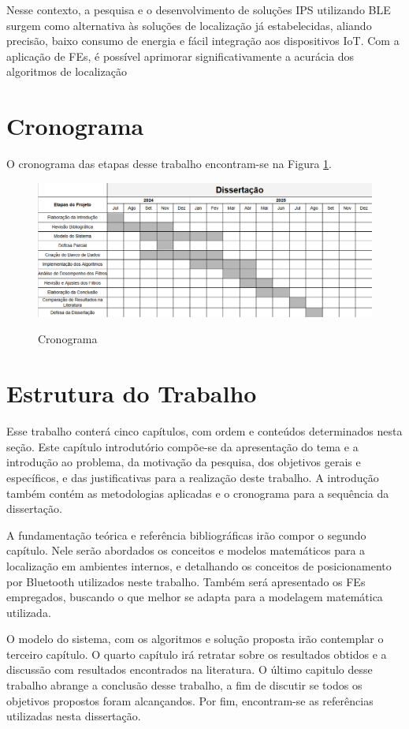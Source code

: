 Nesse contexto, a pesquisa e o desenvolvimento de soluções IPS utilizando BLE surgem como alternativa às soluções de localização já estabelecidas, aliando precisão, baixo consumo de energia e fácil integração aos dispositivos IoT. Com a aplicação de FEs, é possível aprimorar significativamente a acurácia dos algoritmos de localização


\section{Cronograma}
\label{sec:cronograma}

O cronograma das etapas desse trabalho encontram-se na Figura \ref{fig:crongrama}.

\begin{figure}[ht]
    \centering
    \caption{Cronograma}
    \includegraphics[width=\linewidth]{Imagens/cronograma_dissertacao.png}
    \label{fig:crongrama}
\end{figure}

\section{Estrutura do Trabalho}
\label{sec:estrutura}

Esse trabalho conterá cinco capítulos, com ordem e conteúdos determinados nesta seção. Este capítulo introdutório compõe-se da apresentação do tema e a introdução ao problema, da motivação da pesquisa, dos objetivos gerais e específicos, e das justificativas para a realização deste trabalho. A introdução também contém as metodologias aplicadas e o cronograma para a sequência da dissertação.

A fundamentação teórica e referência bibliográficas irão compor o segundo capítulo. Nele serão abordados os conceitos e modelos matemáticos para a localização em ambientes internos, e detalhando os conceitos de posicionamento por Bluetooth utilizados neste trabalho. Também será apresentado os FEs empregados, buscando o que melhor se adapta para a modelagem matemática utilizada.

O modelo do sistema, com os algoritmos e solução proposta irão contemplar o terceiro capítulo. O quarto capítulo irá retratar sobre os resultados obtidos e a discussão com resultados encontrados na literatura. O último capitulo desse trabalho abrange a conclusão desse trabalho, a fim de discutir se todos os objetivos propostos foram alcançandos. Por fim, encontram-se as referências utilizadas nesta dissertação.
